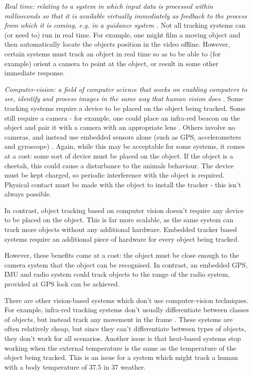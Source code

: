 \textit{Real time: relating to a system in which input data is processed within milliseconds so that it is available virtually immediately as feedback to the process from which it is coming, e.g. in a guidance system \cite{website:definition_real_time}.}
%
Not all tracking systems can (or need to) run in real time. For example, one might film a moving object and then automatically locate the objects position in the video offline. However, certain systems must track an object in real time so as to be able to (for example) orient a camera to point at the object, or result in some other immediate response.



\textit{Computer-vision: a field of computer science that works on enabling computers to see, identify and process images in the same way that human vision does \cite{website:definition_computer_vision}.}
%
Some tracking systems require a device to be placed on the object being tracked. Some still require a camera - for example, one could place an infra-red beacon on the object and pair it with a camera with an appropriate lens \cite{koyuncu2010survey}. Others involve no cameras, and instead use embedded sensors alone (such as GPS, accelerometers and gyroscope) \cite{sakpere2017state}. Again, while this may be acceptable for some systems, it comes at a cost: some sort of device must be placed on the object. If the object is a cheetah, this could cause a disturbance to the animals behaviour. The device must be kept charged, so periodic interference with the object is required. Physical contact must be made with the object to install the tracker - this isn't always possible.

In contrast, object tracking based on computer vision doesn't require any device to be placed on the object. This is far more scalable, as the same system can track more objects without any additional hardware. Embedded tracker based systems require an additional piece of hardware for every object being tracked.

However, these benefits come at a cost: the object must be close enough to the camera system that the object can be recognised. In contrast, an embedded GPS, IMU and radio system could track objects to the range of the radio system, provided at GPS lock can be achieved.

There are other vision-based systems which don't use computer-vision techniques. For example, infra-red tracking systems don't usually differentiate between classes of objects, but instead track any movement in the frame \cite{sakpere2017state}. These systems are often relatively cheap, but since they can't differentiate between types of objects, they don't work for all scenarios. Another issue is that heat-based systems stop working when the external temperature is the same as the temperature of the object being tracked. This is an issue for a system which might track a human with a body temperature of 37.5\textdegree{} in 37\textdegree{} weather.


